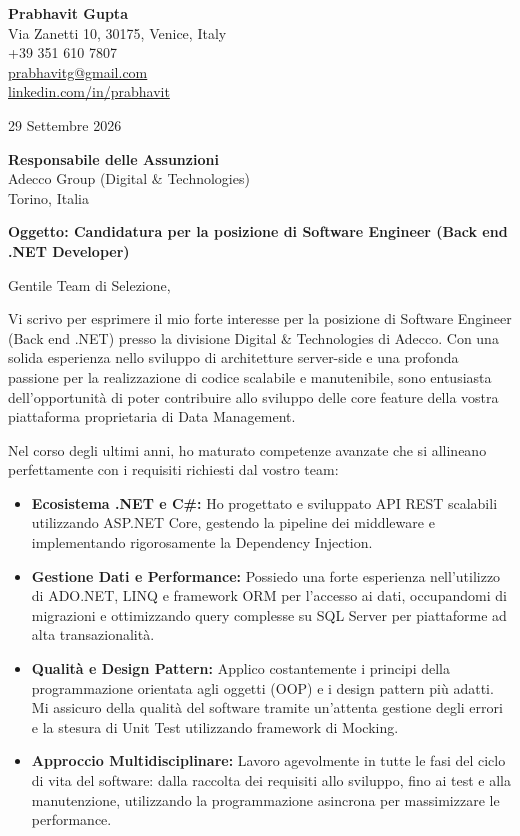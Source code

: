 \documentclass[11pt,a4paper]{article}
\begin{document}
\thispagestyle{empty}

\begin{flushright}
\textbf{Prabhavit Gupta} \\
Via Zanetti 10, 30175, Venice, Italy \\
+39 351 610 7807 \\
\href{mailto:prabhavitg@gmail.com}{prabhavitg@gmail.com} \\
\href{https://www.linkedin.com/in/prabhavit/}{linkedin.com/in/prabhavit} \\
\end{flushright}

\vspace{2em}

29 Settembre 2026

\textbf{Responsabile delle Assunzioni} \\
Adecco Group (Digital \& Technologies) \\
Torino, Italia 

\vspace{1.5em}

\textbf{Oggetto: Candidatura per la posizione di Software Engineer (Back end .NET Developer)}

Gentile Team di Selezione,

Vi scrivo per esprimere il mio forte interesse per la posizione di Software Engineer (Back end .NET) presso la divisione Digital \& Technologies di Adecco. Con una solida esperienza nello sviluppo di architetture server-side e una profonda passione per la realizzazione di codice scalabile e manutenibile, sono entusiasta dell'opportunità di poter contribuire allo sviluppo delle core feature della vostra piattaforma proprietaria di Data Management.

Nel corso degli ultimi anni, ho maturato competenze avanzate che si allineano perfettamente con i requisiti richiesti dal vostro team:

\begin{itemize}
    \item \textbf{Ecosistema .NET e C\#:} Ho progettato e sviluppato API REST scalabili utilizzando ASP.NET Core, gestendo la pipeline dei middleware e implementando rigorosamente la Dependency Injection.
    \item \textbf{Gestione Dati e Performance:} Possiedo una forte esperienza nell'utilizzo di ADO.NET, LINQ e framework ORM per l'accesso ai dati, occupandomi di migrazioni e ottimizzando query complesse su SQL Server per piattaforme ad alta transazionalità.
    \item \textbf{Qualità e Design Pattern:} Applico costantemente i principi della programmazione orientata agli oggetti (OOP) e i design pattern più adatti. Mi assicuro della qualità del software tramite un'attenta gestione degli errori e la stesura di Unit Test utilizzando framework di Mocking.
    \item \textbf{Approccio Multidisciplinare:} Lavoro agevolmente in tutte le fasi del ciclo di vita del software: dalla raccolta dei requisiti allo sviluppo, fino ai test e alla manutenzione, utilizzando la programmazione asincrona per massimizzare le performance.
\end{itemize}
\end{document}
